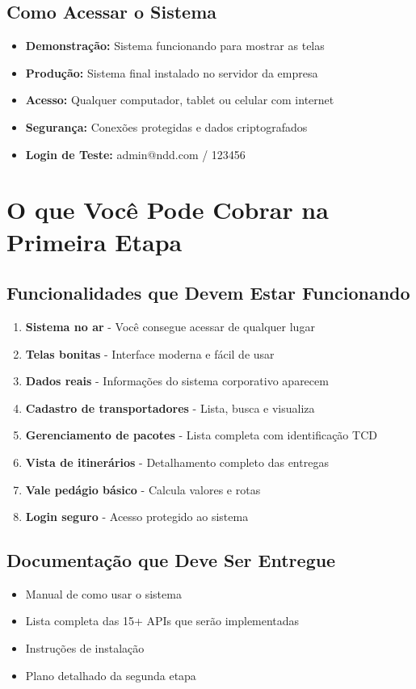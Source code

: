 \documentclass[12pt,a4paper]{article}
\begin{document}
\subsection{Como Acessar o Sistema}
\begin{itemize}
    \item \textbf{Demonstração:} Sistema funcionando para mostrar as telas
    \item \textbf{Produção:} Sistema final instalado no servidor da empresa
    \item \textbf{Acesso:} Qualquer computador, tablet ou celular com internet
    \item \textbf{Segurança:} Conexões protegidas e dados criptografados
    \item \textbf{Login de Teste:} admin@ndd.com / 123456
\end{itemize}

\section{O que Você Pode Cobrar na Primeira Etapa}

\subsection{Funcionalidades que Devem Estar Funcionando}
\begin{enumerate}
    \item \textbf{Sistema no ar} - Você consegue acessar de qualquer lugar
    \item \textbf{Telas bonitas} - Interface moderna e fácil de usar
    \item \textbf{Dados reais} - Informações do sistema corporativo aparecem
    \item \textbf{Cadastro de transportadores} - Lista, busca e visualiza
    \item \textbf{Gerenciamento de pacotes} - Lista completa com identificação TCD
    \item \textbf{Vista de itinerários} - Detalhamento completo das entregas
    \item \textbf{Vale pedágio básico} - Calcula valores e rotas
    \item \textbf{Login seguro} - Acesso protegido ao sistema
\end{enumerate}

\subsection{Documentação que Deve Ser Entregue}
\begin{itemize}
    \item Manual de como usar o sistema
    \item Lista completa das 15+ APIs que serão implementadas
    \item Instruções de instalação
    \item Plano detalhado da segunda etapa
\end{itemize}
\end{document}
